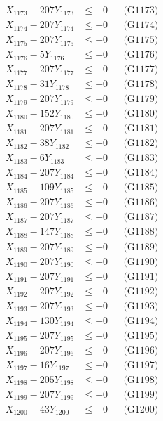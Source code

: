 \documentclass[a4paper,10pt]{article}
\begin{document}
{\begin{align}
X_{1173} - 207Y_{1173} &\leq +0 && \text{(G1173)} \\
X_{1174} - 207Y_{1174} &\leq +0 && \text{(G1174)} \\
X_{1175} - 207Y_{1175} &\leq +0 && \text{(G1175)} \\
X_{1176} - 5Y_{1176} &\leq +0 && \text{(G1176)} \\
X_{1177} - 207Y_{1177} &\leq +0 && \text{(G1177)} \\
X_{1178} - 31Y_{1178} &\leq +0 && \text{(G1178)} \\
X_{1179} - 207Y_{1179} &\leq +0 && \text{(G1179)} \\
X_{1180} - 152Y_{1180} &\leq +0 && \text{(G1180)} \\
\allowbreak
X_{1181} - 207Y_{1181} &\leq +0 && \text{(G1181)} \\
X_{1182} - 38Y_{1182} &\leq +0 && \text{(G1182)} \\
X_{1183} - 6Y_{1183} &\leq +0 && \text{(G1183)} \\
X_{1184} - 207Y_{1184} &\leq +0 && \text{(G1184)} \\
X_{1185} - 109Y_{1185} &\leq +0 && \text{(G1185)} \\
X_{1186} - 207Y_{1186} &\leq +0 && \text{(G1186)} \\
X_{1187} - 207Y_{1187} &\leq +0 && \text{(G1187)} \\
X_{1188} - 147Y_{1188} &\leq +0 && \text{(G1188)} \\
X_{1189} - 207Y_{1189} &\leq +0 && \text{(G1189)} \\
X_{1190} - 207Y_{1190} &\leq +0 && \text{(G1190)} \\
\allowbreak
X_{1191} - 207Y_{1191} &\leq +0 && \text{(G1191)} \\
X_{1192} - 207Y_{1192} &\leq +0 && \text{(G1192)} \\
X_{1193} - 207Y_{1193} &\leq +0 && \text{(G1193)} \\
X_{1194} - 130Y_{1194} &\leq +0 && \text{(G1194)} \\
X_{1195} - 207Y_{1195} &\leq +0 && \text{(G1195)} \\
X_{1196} - 207Y_{1196} &\leq +0 && \text{(G1196)} \\
X_{1197} - 16Y_{1197} &\leq +0 && \text{(G1197)} \\
X_{1198} - 205Y_{1198} &\leq +0 && \text{(G1198)} \\
X_{1199} - 207Y_{1199} &\leq +0 && \text{(G1199)} \\
X_{1200} - 43Y_{1200} &\leq +0 && \text{(G1200)} \\

\end{align}}
\end{document}
